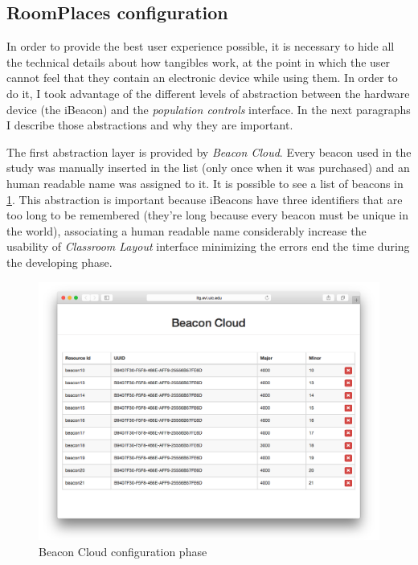 \subsection{RoomPlaces configuration}
In order to provide the best user experience possible, it is necessary to hide all the technical details about how tangibles work, at the point in which the user cannot feel that they contain an electronic device while using them. In order to do it, I took advantage of the different levels of abstraction between the hardware device (the iBeacon) and the \textit{population controls} interface. In the next paragraphs I describe those abstractions and why they are important.

The first abstraction layer is provided by \textit{Beacon Cloud}. Every beacon used in the study was manually inserted in the list (only once when it was purchased) and an human readable name was assigned to it. It is possible to see a list of beacons in \ref{fig:wallcology_beacon_cloud}. This abstraction is important because iBeacons have three identifiers that are too long to be remembered (they're long because every beacon must be unique in the world), associating a human readable name considerably increase the usability of \textit{Classroom Layout} interface minimizing the errors end the time during the developing phase.

\begin{figure}
\centering
\includegraphics[width=4.5in]{images/wallcology-beacon-cloud.png}
\caption{Beacon Cloud configuration phase}
\label{fig:wallcology_beacon_cloud}
\end{figure}

